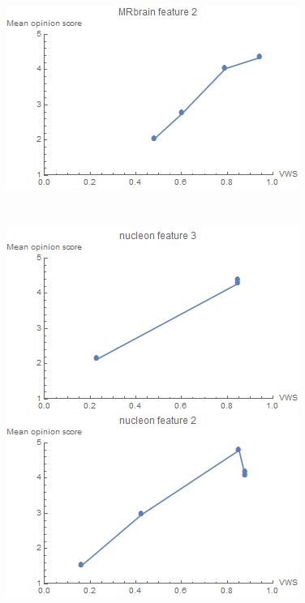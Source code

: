 \begin{figure}
\begin{minipage}{.24\textwidth}
		\subcaption{}
	\end{minipage}~
	\begin{minipage}{.24\textwidth}
		\includegraphics[width=1\linewidth]{images/mos_vs_metric_MRbrain_feature_2}
		\subcaption{}
	\end{minipage}~
	\begin{minipage}{.24\textwidth}
		\includegraphics[width=1\linewidth]{images/mos_vs_metric_nucleon_feature_3}
		\subcaption{}
	\end{minipage}
	\begin{minipage}{.24\textwidth}
		\includegraphics[width=1\linewidth]{images/mos_vs_metric_nucleon_feature_2}

\end{minipage}
\end{figure}

